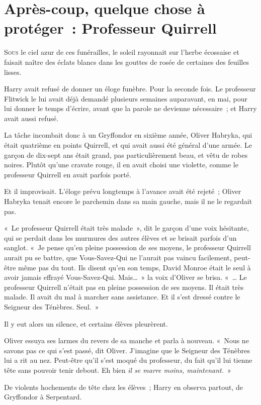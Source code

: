 \chapter{Après-coup, quelque chose à protéger~: Professeur Quirrell}

\lettrine{S}{ous} le ciel azur de ces funérailles, le soleil rayonnait sur l'herbe écossaise et faisait naître des éclats blancs dans les gouttes de rosée de certaines des feuilles lisses.

Harry avait refusé de donner un éloge funèbre.
Pour la seconde fois.
Le professeur Flitwick le lui avait déjà demandé plusieurs semaines auparavant, en mai, pour lui donner le temps d'écrire, avant que la parole ne devienne nécessaire~; et Harry avait aussi refusé.

La tâche incombait donc à un Gryffondor en sixième année, Oliver Habryka, qui était quatrième en points Quirrell, et qui avait aussi été général d'une armée.
Le garçon de dix-sept ans était grand, pas particulièrement beau, et vêtu de robes noires.
Plutôt qu'une cravate rouge, il en avait choisi une violette, comme le professeur Quirrell en avait parfois porté.

Et il improvisait.
L'éloge prévu longtemps à l'avance avait été rejeté~; Oliver Habryka tenait encore le parchemin dans sa main gauche, mais il ne le regardait pas.

«~Le professeur Quirrell était très malade~», dit le garçon d'une voix hésitante, qui se perdait dans les murmures des autres élèves et se brisait parfois d'un sanglot.
«~Je pense qu'en pleine possession de ses moyens, le professeur Quirrell aurait pu se battre, que Vous-Savez-Qui ne l'aurait pas vaincu facilement, peut-être même pas du tout.
Ils disent qu'en son temps, David Monroe était le seul à avoir jamais effrayé Vous-Savez-Qui.
Mais…~» la voix d'Oliver se brisa.
«~… Le professeur Quirrell n'était pas en pleine possession de ses moyens.
Il était très malade.
Il avait du mal à marcher sans assistance.
Et il s'est dressé contre le Seigneur des Ténèbres.
Seul.~»

Il y eut alors un silence, et certains élèves pleurèrent.

Oliver essuya ses larmes du revers de sa manche et parla à nouveau.
«~Nous ne savons pas ce qui s'est passé, dit Oliver.
J'imagine que le Seigneur des Ténèbres lui a rit au nez.
Peut-être qu'il s'est moqué du professeur, du fait qu'il lui tienne tête sans pouvoir tenir debout.
Eh bien \emph{il se marre moins, maintenant.}~»

De violents hochements de tête chez les élèves~; Harry en observa partout, de Gryffondor à Serpentard.

